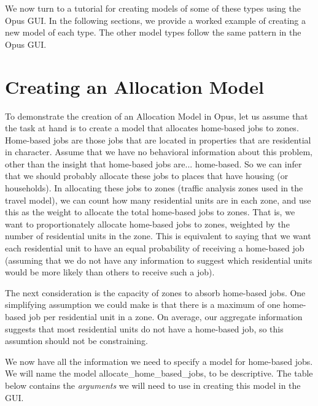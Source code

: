 We now turn to a tutorial for creating models of some of these types using the Opus GUI.  In the following sections, we provide a worked example of creating a new model of each type.  The other model types follow the same pattern in the Opus GUI.

\section{Creating an Allocation Model}

To demonstrate the creation of an Allocation Model in Opus, let us assume that the task at hand is to create a model that allocates home-based jobs to zones.  Home-based jobs are those jobs that are located in properties that are residential in character.  Assume that we have no behavioral information about this problem, other than the insight that home-based jobs are... home-based.  So we can infer that we should probably allocate these jobs to places that have housing (or households).  In allocating these jobs to zones (traffic analysis zones used in the travel model), we can count how many residential units are in each zone, and use this as the weight to allocate the total home-based jobs to zones.  That is, we want to proportionately allocate home-based jobs to zones, weighted by the number of residential units in the zone.  This is equivalent to saying that we want each residential unit to have an equal probability of receiving a home-based job (assuming that we do not have any information to suggest which residential units would be more likely than others to receive such a job).

The next consideration is the capacity of zones to absorb home-based jobs.  One simplifying assumption we could make is that there is a maximum of one home-based job per residential unit in a zone.  On average, our aggregate information suggests that most residential units do not have a home-based job, so this assumtion should not be constraining.

We now have all the information we need to specify a model for home-based jobs.  We will name the model allocate\_home\_based\_jobs, to be descriptive.  The table below contains the \emph{arguments} we will need to use in creating this model in the GUI.

